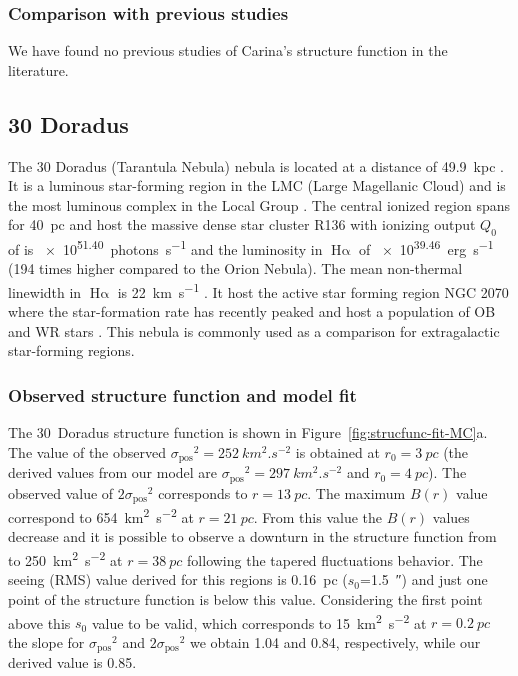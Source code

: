 \documentclass[fleqn,usenatbib, useAMS, a4paper]{mnras}
\newcommand\pos{\ensuremath{_{\mathrm{pos}}}}
\newcommand\ha{\ensuremath{\text{H}\upalpha}}
\begin{document}
\subsubsection{Comparison with previous studies}
\label{sec:comparison-carina}

We have found no previous studies of Carina's structure function in the literature.

\subsection{30 Doradus}
\label{sec:30-doradus}

The 30 Doradus (Tarantula Nebula) nebula is located at a distance of \SI{49.9}{kpc} \citetext{\SI{1}{\arcsecond} = \SI{0.24}{pc} ; \citealp{2013Natur.495...76P}}.
It is a luminous star-forming region in the LMC (Large Magellanic Cloud) and is the most luminous complex in the Local Group \citep{1984ApJ...287..116K}.
The central ionized region spans for \SI{40}{pc} and host the massive dense star cluster R136
with ionizing output \(Q_0\) of is \SI{e51.40}{photons.s^{-1}} \citep{2020MNRAS.499.1918B} and the luminosity in \ha{} of \SI{e39.46}{erg.s^{-1}} (194 times higher compared to the Orion Nebula).
The mean non-thermal linewidth in \ha{} is \SI{22}{km.s^{-1}} \citep{2013A&A...555A..60T}.
It host the active star forming region NGC 2070 \citep{2013AJ....145...98W} where the star-formation rate has recently peaked \citep{2015ApJ...811...76C} and host a population of OB and WR stars \citep{2011A&A...530A.108E}.
This nebula is commonly used as a comparison for extragalactic star-forming regions.

\subsubsection{Observed structure function and model fit}
\label{sec:observ-struct-funct-30dor}

The 30~Doradus structure function is shown in Figure~\ref{fig:strucfunc-fit-MC}a.
The value of the observed \(\sigma\pos^2 = \SI{252}{km^{2}.s^{-2}}\) is obtained at \(r_0 = \SI{3}{pc} \) (the derived values from our model are \(\sigma\pos^2 = \SI{297}{km^{2}.s^{-2}}\) and \(r_0 = \SI{4}{pc} \)).
The observed value of \(2\sigma\pos^2\) corresponds to \(r = \SI{13}{pc} \).
The maximum \(B(r)\) value correspond to \SI{654}{km^{2}.s^{-2}} at \(r = \SI{21}{pc}\).
From this value the \(B(r)\) values decrease and it is possible to observe a downturn in the structure function from to \SI{250}{km^{2}.s^{-2}} at \(r =  \SI{38}{pc}\) following the tapered fluctuations behavior.
The seeing (RMS) value derived for this regions is \SI{0.16}{pc} (\(s_0\)=\SI{1.5}{\arcsecond}) and just one point of the structure function is below this value.
Considering the first point above this \(s_0\) value to be valid, which corresponds to \SI{15}{km^{2}.s^{-2}} at \(r = \SI{0.2}{pc} \) the slope for \(\sigma\pos^2\) and \(2\sigma\pos^2\) we obtain \num{1.04} and \num{0.84}, respectively, while our derived value is \num{0.85}.
\end{document}
